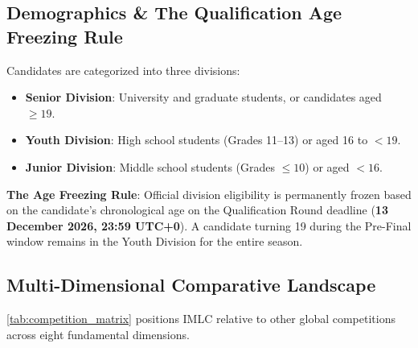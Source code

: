 \documentclass[11pt,a4paper]{article}
\theoremstyle{definition}
\theoremstyle{plain}
\theoremstyle{remark}
\begin{document}
\subsection{Demographics \& The Qualification Age Freezing Rule}
Candidates are categorized into three divisions:
\begin{itemize}[noitemsep]
    \item \textbf{Senior Division}: University and graduate students, or candidates aged $\ge 19$.
    \item \textbf{Youth Division}: High school students (Grades 11--13) or aged 16 to $<19$.
    \item \textbf{Junior Division}: Middle school students (Grades $\le 10$) or aged $<16$.
\end{itemize}
\textbf{The Age Freezing Rule}: Official division eligibility is permanently frozen based on the candidate's chronological age on the Qualification Round deadline (\textbf{13 December 2026, 23:59 UTC+0}). A candidate turning 19 during the Pre-Final window remains in the Youth Division for the entire season.

\subsection{Multi-Dimensional Comparative Landscape}
\cref{tab:competition_matrix} positions IMLC relative to other global competitions across eight fundamental dimensions.
\end{document}
